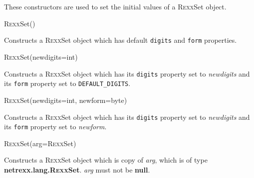 \section{}\label{}
 
These constructors are used to set the initial values of a R\textsc{exx}Set
object.
\begin{description}
\item{R\textsc{exx}Set()}

Constructs a R\textsc{exx}Set object which has default \texttt{digits} and
\texttt{form} properties.
\item{R\textsc{exx}Set(newdigits=int)}

Constructs a R\textsc{exx}Set object which has its \texttt{digits} property set
to \emph{newdigits} and its \texttt{form} property set
to \texttt{DEFAULT\_DIGITS}.
\item{R\textsc{exx}Set(newdigits=int, newform=byte)}

Constructs a R\textsc{exx}Set object which has its \texttt{digits} property set
to \emph{newdigits} and its \texttt{form} property set to
\emph{newform}.
\item{R\textsc{exx}Set(arg=R\textsc{exx}Set)}

Constructs a R\textsc{exx}Set object which is copy of \emph{arg}, which is of
type \textbf{netrexx.lang.R\textsc{exx}Set}.
\emph{arg} must not be \textbf{null}.
\end{description}
\section{}\label{}
 
